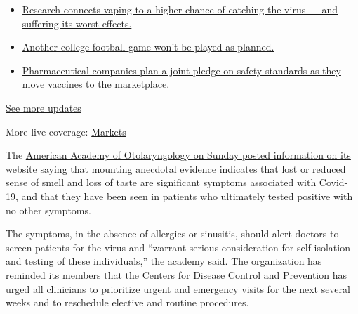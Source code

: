 \begin{itemize}
\tightlist
\item
  \href{https://www.nytimes3xbfgragh.onion/2020/09/04/world/covid-19-coronavirus.html?action=click\&pgtype=Article\&state=default\&region=MAIN_CONTENT_1\&context=storylines_live_updates\#link-1654f6ad}{Research
  connects vaping to a higher chance of catching the virus --- and
  suffering its worst effects.}
\item
  \href{https://www.nytimes3xbfgragh.onion/2020/09/04/world/covid-19-coronavirus.html?action=click\&pgtype=Article\&state=default\&region=MAIN_CONTENT_1\&context=storylines_live_updates\#link-52e4198a}{Another
  college football game won't be played as planned.}
\item
  \href{https://www.nytimes3xbfgragh.onion/2020/09/04/world/covid-19-coronavirus.html?action=click\&pgtype=Article\&state=default\&region=MAIN_CONTENT_1\&context=storylines_live_updates\#link-181cef0}{Pharmaceutical
  companies plan a joint pledge on safety standards as they move
  vaccines to the marketplace.}
\end{itemize}

\href{https://www.nytimes3xbfgragh.onion/2020/09/04/world/covid-19-coronavirus.html?action=click\&pgtype=Article\&state=default\&region=MAIN_CONTENT_1\&context=storylines_live_updates}{See
more updates}

More live coverage:
\href{https://www.nytimes3xbfgragh.onion/live/2020/09/04/business/stock-market-today-coronavirus?action=click\&pgtype=Article\&state=default\&region=MAIN_CONTENT_1\&context=storylines_live_updates}{Markets}

The
\href{https://www.entnet.org/content/coronavirus-disease-2019-resources}{American
Academy of Otolaryngology on Sunday posted information on its website}
saying that mounting anecdotal evidence indicates that lost or reduced
sense of smell and loss of taste are significant symptoms associated
with Covid-19, and that they have been seen in patients who ultimately
tested positive with no other symptoms.

The symptoms, in the absence of allergies or sinusitis, should alert
doctors to screen patients for the virus and ``warrant serious
consideration for self isolation and testing of these individuals,'' the
academy said. The organization has reminded its members that the Centers
for Disease Control and Prevention
\href{https://www.entnet.org/content/new-recommendations-regarding-urgent-and-nonurgent-patient-care}{has
urged all clinicians to prioritize urgent and emergency visits} for the
next several weeks and to reschedule elective and routine procedures.

